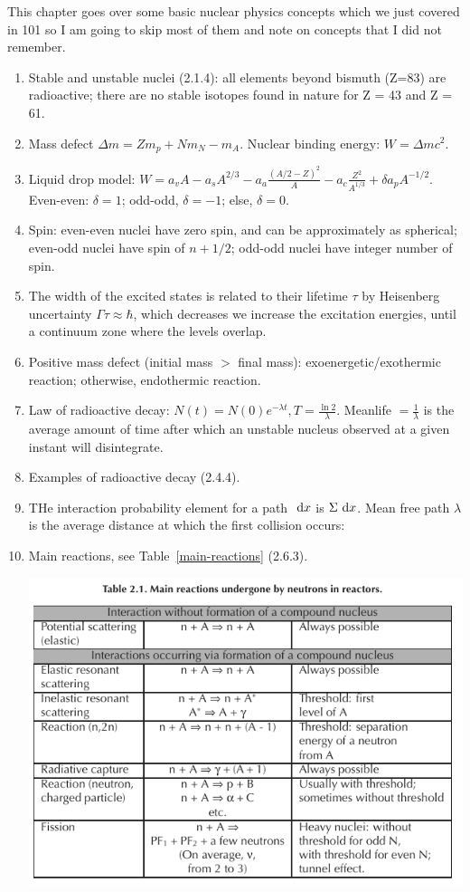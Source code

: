 \documentclass{school-22.211-notes}
\begin{document}
\clearpage
This chapter goes over some basic nuclear physics concepts which we just covered in 101 so I am going to skip most of them and note on concepts that I did not remember.
\begin{enumerate}
\item Stable and unstable nuclei (2.1.4): all elements beyond bismuth (Z=83) are radioactive; there are no stable isotopes found in nature for Z = 43 and Z = 61. 
\item Mass defect $\Delta m = Z m_p + N m_N - m_A$. Nuclear binding energy: $W = \Delta m c^2$. 
\item Liquid drop model: $W = a_v A - a_s A^{2/3} - a_a \frac{(A/2 - Z)^2}{A} - a_c \frac{Z^2}{A^{1/3}} + \delta a_p A^{-1/2}.$ Even-even: $\delta = 1$; odd-odd, $\delta = -1$; else, $\delta = 0$. 
\item Spin: even-even nuclei have zero spin, and can be approximately as spherical; even-odd nuclei have spin of $n+1/2$; odd-odd nuclei have integer number of spin. 
\item The width of the excited states is related to their lifetime $\tau$ by Heisenberg uncertainty $\Gamma \tau \approx \hbar$, which decreases we increase the excitation energies, until a continuum zone where the levels overlap. 
\item Positive mass defect (initial mass $>$ final mass): exoenergetic/exothermic reaction; otherwise, endothermic reaction. 
\item Law of radioactive decay: $N(t) = N(0) e^{-\lambda t}, T = \frac{\ln 2}{\lambda}$. Meanlife $=\frac{1}{\lambda}$ is the average amount of time after which an unstable nucleus observed at a given instant will disintegrate.  
\item Examples of radioactive decay (2.4.4).
\item THe interaction probability element for a path $\mbox{ }\mathrm{d} x$ is $\Sigma \mbox{ }\mathrm{d} x$. Mean free path $\lambda$ is the average distance at which the first collision occurs:
\item Main reactions, see Table~\ref{main-reactions} (2.6.3).
  \begin{table}
    \centering
    \includegraphics[width=5in]{images/intro/main-reactions.png}

\end{table}
\end{enumerate}
\end{document}
